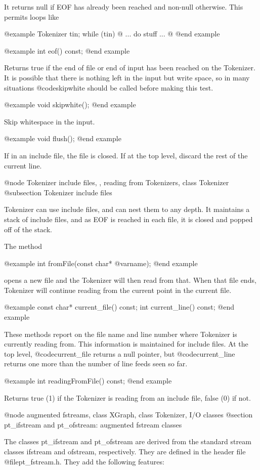 It returns null if EOF has already been reached and non-null otherwise.
This permits loops like

@example
Tokenizer tin;
while (tin) @{ ... do stuff ... @}
@end example

@example
int eof() const;
@end example

Returns true if the end of file or end of input has been reached on
the Tokenizer.  It is possible that there is nothing left in the input
but write space, so in many situations @code{skipwhite} should be called
before making this test.

@example
void skipwhite();
@end example

Skip whitespace in the input.

@example
void flush();
@end example

If in an include file, the file is closed.  If at the top level,
discard the rest of the current line.

@node Tokenizer include files,  , reading from Tokenizers, class Tokenizer
@subsection Tokenizer include files

Tokenizer can use include files, and can nest them to any depth.
It maintains a stack of include files, and as EOF is reached in each
file, it is closed and popped off of the stack.

The method

@example
int fromFile(const char* @var{name});
@end example

opens a new file and the Tokenizer will then read from that.  When that
file ends, Tokenizer will continue reading from the current point in
the current file.

@example
const char* current_file() const;
int current_line() const;
@end example

These methods report on the file name and line number where Tokenizer is
currently reading from.  This information is maintained for include
files.  At the top level,  @code{current_file} returns a null pointer,
but @code{current_line} returns one more than the number of line feeds
seen so far.

@example
int readingFromFile() const;
@end example

Returns true (1) if the Tokenizer is reading from an include file,
false (0) if not.

@node augmented fstreams, class XGraph, class Tokenizer, I/O classes
@section pt_ifstream and pt_ofstream: augmented fstream classes

The classes pt_ifstream and pt_ofstream are derived from the standard
stream classes ifstream and ofstream, respectively.  They are defined
in the header file @file{pt_fstream.h}.  They add the
following features:

